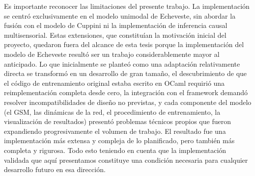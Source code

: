 
Es importante reconocer las limitaciones del presente trabajo. La implementación se centró exclusivamente en el modelo unimodal de Echeveste, sin abordar la fusión con el modelo de Cuppini ni la implementación de inferencia causal multisensorial. Estas extensiones, que constituían la motivación inicial del proyecto, quedaron fuera del alcance de esta tesis porque la implementación del modelo de Echeveste resultó ser un trabajo considerablemente mayor al anticipado. Lo que inicialmente se planteó como una adaptación relativamente directa se transformó en un desarrollo de gran tamaño, el descubrimiento de que el código de entrenamiento original estaba escrito en OCaml requirió una reimplementación completa desde cero, la integración con el framework demandó resolver incompatibilidades de diseño no previstas, y cada componente del modelo (el \acrshort{GSM}, las dinámicas de la red, el procedimiento de entrenamiento, la visualización de resultados) presentó problemas técnicos propios que fueron expandiendo progresivamente el volumen de trabajo. El resultado fue una implementación más extensa y compleja de lo planificado, pero también más completa y rigurosa. Todo esto teniendo en cuenta que la implementación validada que aquí presentamos constituye una condición necesaria para cualquier desarrollo futuro en esa dirección.


